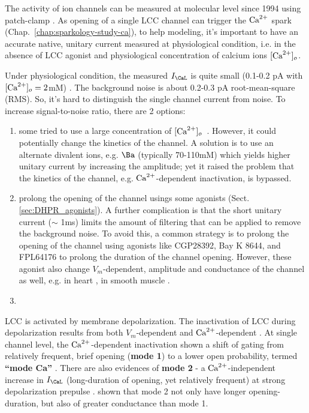 The activity of ion channels can be measured at molecular level since
1994 using patch-clamp \citep{mcdonald1994}. As opening of a single
LCC channel can trigger the ${\text{Ca}^{2+}}$ spark
(Chap.~\ref{chap:sparkology-study-ca}), to help modeling, it's
important to have an accurate native, unitary current measured at
physiological condition, i.e. in the absence of LCC agonist and
physiological concentration of calcium ions $[{\text{Ca}^{2+}}]_o$. 

Under physiological condition, the measured $I_\CaL$ is quite small (0.1-0.2 pA
with $[{\text{Ca}^{2+}}]_o =2$mM) \citep{church1996,guia1999,rubart1996,yue1990}. The
background noise is about 0.2-0.3 pA root-mean-square (RMS). So, it's hard to
distinguish the single channel current from noise. To increase signal-to-noise
ratio, there are 2 options:
\begin{enumerate}
  \item some tried to use a large
concentration of $[{\text{Ca}^{2+}}]_o$~\citep{imredy1994mcs}. However, it could potentially
change the kinetics of the channel. A
solution is to  use an alternate divalent ions, e.g. $\Ba$ (typically 70-110mM)
\citep{pietrobon1990,hirano1999} which yields higher unitary  current by
increasing the amplitude; yet it raised the problem that  the kinetics of the
channel, e.g. ${\text{Ca}^{2+}}$-dependent inactivation, is  bypassed. 

  \item prolong the opening of the channel usings some agonists
  (Sect.\ref{sec:DHPR_agonists}). A further complication is that the short unitary current ($\sim$ 1ms)
limits the amount of filtering that can be applied to remove the
background noise. To avoid this, a common strategy is to prolong the
opening of the channel using agonists like CGP28392, Bay K 8644, and
FPL64176 \citep{mcdonald1994,yue1990,imredy1994mcs, fan2000} to prolong the
duration of the channel opening. However, these agonist also change
$V_m$-dependent, amplitude and conductance of the channel as well,
e.g. in
heart \citep{kokubun1984,hess1986ccs,handrock1998,
  reuter1988,fan2000}, in smooth muscle \citep{caffrey1986}.
  \item 
\end{enumerate}

LCC is activated by membrane depolarization. The inactivation of LCC
during depolarization results from both
$V_m$-dependent \citep{hadley1987} and
${\text{Ca}^{2+}}$-dependent \citep{lee1985icc}. At single channel level, the
${\text{Ca}^{2+}}$-dependent inactivation shown a shift of gating from relatively
frequent, brief opening ({\bf mode 1}) to a lower open probability,
termed {\bf ``mode Ca''} \citep{imredy1994mcs}. There are also
evidences of {\bf mode 2} - a ${\text{Ca}^{2+}}$-independent increase in $I_\CaL$
(long-duration of opening, yet relatively frequent) at strong
depolarization
prepulse \citep{pietrobon1990, 
  josephson2002mgu}. \citep{josephson2002mcu}
shown that mode 2 not only have longer opening-duration, but also of
greater conductance than mode 1.

